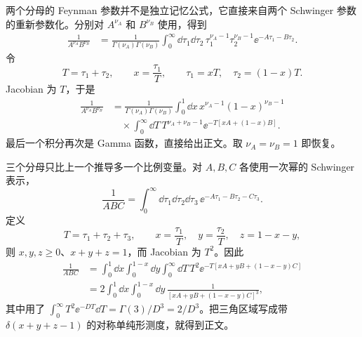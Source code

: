 
\begin{derivation}
两个分母的 Feynman 参数并不是独立记忆公式，它直接来自两个 Schwinger 参数的重新参数化。分别对 $A^{\nu_A}$ 和 $B^{\nu_B}$ 使用，得到
\begin{align*}
 \frac1{A^{\nu_A}B^{\nu_B}}
 &=\frac1{\Gamma(\nu_A)\Gamma(\nu_B)}
 \int_0^\infty\dd\tau_1\dd\tau_2\,
 \tau_1^{\nu_A-1}\tau_2^{\nu_B-1}
 \ee^{-A\tau_1-B\tau_2}.
\end{align*}
令
\begin{equation*}
 T=\tau_1+\tau_2,
 \qquad x=\frac{\tau_1}{T},
 \qquad
 \tau_1=xT,
 \quad \tau_2=(1-x)T.
\end{equation*}
Jacobian 为 $T$，于是
\begin{align*}
 \frac1{A^{\nu_A}B^{\nu_B}}
 &=\frac1{\Gamma(\nu_A)\Gamma(\nu_B)}
 \int_0^1\dd x\,x^{\nu_A-1}(1-x)^{\nu_B-1}\\
 &\quad\times\int_0^\infty\dd T\,
 T^{\nu_A+\nu_B-1}
 \ee^{-T[xA+(1-x)B]}.
\end{align*}
最后一个积分再次是 Gamma 函数，直接给出正文。取 $\nu_A=\nu_B=1$ 即恢复。
\end{derivation}

\begin{derivation}
三个分母只比上一个推导多一个比例变量。对 $A,B,C$ 各使用一次幂的 Schwinger 表示，
\begin{equation*}
 \frac1{ABC}
 =\int_0^\infty\dd\tau_1\dd\tau_2\dd\tau_3\,
 \ee^{-A\tau_1-B\tau_2-C\tau_3}.
\end{equation*}
定义
\begin{equation*}
 T=\tau_1+\tau_2+\tau_3,
 \qquad x=\frac{\tau_1}{T},
 \quad y=\frac{\tau_2}{T},
 \quad z=1-x-y,
\end{equation*}
则 $x,y,z\ge0$、$x+y+z=1$，而 Jacobian 为 $T^2$。因此
\begin{align*}
 \frac1{ABC}
 &=\int_0^1\dd x\int_0^{1-x}\dd y
 \int_0^\infty\dd T\,T^2
 \ee^{-T[xA+yB+(1-x-y)C]}\\
 &=2\int_0^1\dd x\int_0^{1-x}\dd y\,
 \frac1{[xA+yB+(1-x-y)C]^3},
\end{align*}
其中用了 $\int_0^\infty T^2\ee^{-DT}\dd T=\Gamma(3)/D^3=2/D^3$。把三角区域写成带 $\delta(x+y+z-1)$ 的对称单纯形测度，就得到正文。
\end{derivation}







